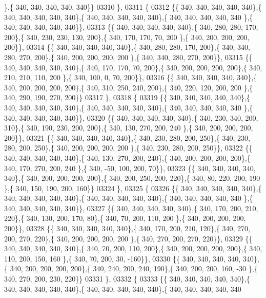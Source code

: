 \begin{DoxyCode}
      \},\{ 340, 340, 340, 340, 340\}\}
03310 \},
03311 \{
03312 \{\{ 340, 340, 340, 340, 340\},\{ 340, 340, 340, 340, 340\},\{ 340, 340, 340, 340, 340\},\{ 340, 340, 340, 340, 340
      \},\{ 340, 340, 340, 340, 340\}\},
03313 \{\{ 340, 340, 340, 340, 340\},\{ 340, 280, 280, 170, 200\},\{ 340, 230, 230, 130, 200\},\{ 340, 170, 170,  70, 200
      \},\{ 340, 200, 200, 200, 200\}\},
03314 \{\{ 340, 340, 340, 340, 340\},\{ 340, 280, 280, 170, 200\},\{ 340, 340, 280, 270, 200\},\{ 340, 200, 200, 200, 200
      \},\{ 340, 340, 280, 270, 200\}\},
03315 \{\{ 340, 340, 340, 340, 340\},\{ 340, 170, 170,  70, 200\},\{ 340, 200, 200, 200, 200\},\{ 340, 210, 210, 110, 200
      \},\{ 340, 100,   0,  70, 200\}\},
03316 \{\{ 340, 340, 340, 340, 340\},\{ 340, 200, 200, 200, 200\},\{ 340, 310, 250, 240, 200\},\{ 340, 220, 120, 200, 200
      \},\{ 340, 290, 190, 270, 200\}\}
03317 \},
03318 \{
03319 \{\{ 340, 340, 340, 340, 340\},\{ 340, 340, 340, 340, 340\},\{ 340, 340, 340, 340, 340\},\{ 340, 340, 340, 340, 340
      \},\{ 340, 340, 340, 340, 340\}\},
03320 \{\{ 340, 340, 340, 340, 340\},\{ 340, 230, 340, 200, 310\},\{ 340, 190, 230, 200, 200\},\{ 340, 130, 270, 200, 240
      \},\{ 340, 200, 200, 200, 200\}\},
03321 \{\{ 340, 340, 340, 340, 340\},\{ 340, 230, 280, 200, 250\},\{ 340, 230, 280, 200, 250\},\{ 340, 200, 200, 200, 200
      \},\{ 340, 230, 280, 200, 250\}\},
03322 \{\{ 340, 340, 340, 340, 340\},\{ 340, 130, 270, 200, 240\},\{ 340, 200, 200, 200, 200\},\{ 340, 170, 270, 200, 240
      \},\{ 340, -50, 100, 200,  70\}\},
03323 \{\{ 340, 340, 340, 340, 340\},\{ 340, 200, 200, 200, 200\},\{ 340, 200, 250, 200, 220\},\{ 340,  80, 220, 200, 190
      \},\{ 340, 150, 190, 200, 160\}\}
03324 \},
03325 \{
03326 \{\{ 340, 340, 340, 340, 340\},\{ 340, 340, 340, 340, 340\},\{ 340, 340, 340, 340, 340\},\{ 340, 340, 340, 340, 340
      \},\{ 340, 340, 340, 340, 340\}\},
03327 \{\{ 340, 340, 340, 340, 340\},\{ 340, 170, 200, 210, 220\},\{ 340, 130, 200, 170,  80\},\{ 340,  70, 200, 110, 200
      \},\{ 340, 200, 200, 200, 200\}\},
03328 \{\{ 340, 340, 340, 340, 340\},\{ 340, 170, 200, 210, 120\},\{ 340, 270, 200, 270, 220\},\{ 340, 200, 200, 200, 200
      \},\{ 340, 270, 200, 270, 220\}\},
03329 \{\{ 340, 340, 340, 340, 340\},\{ 340,  70, 200, 110, 200\},\{ 340, 200, 200, 200, 200\},\{ 340, 110, 200, 150, 160
      \},\{ 340,  70, 200,  30, -160\}\},
03330 \{\{ 340, 340, 340, 340, 340\},\{ 340, 200, 200, 200, 200\},\{ 340, 240, 200, 240, 190\},\{ 340, 200, 200, 160, -30
      \},\{ 340, 270, 200, 230, 220\}\}
03331 \},
03332 \{
03333 \{\{ 340, 340, 340, 340, 340\},\{ 340, 340, 340, 340, 340\},\{ 340, 340, 340, 340, 340\},\{ 340, 340, 340, 340, 340

\end{DoxyCode}
